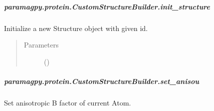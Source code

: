 \documentclass[a4paper,10pt,english]{sphinxmanual}
\begin{document}
\begin{fulllineitems}
\begin{fulllineitems}
\begin{fulllineitems}
\begin{quote}
\begin{description}
\end{description}\end{quote}

\end{fulllineitems}



\subparagraph{paramagpy.protein.CustomStructureBuilder.init\_structure}
\label{\detokenize{reference/generated/paramagpy.protein.CustomStructureBuilder.init_structure:paramagpy-protein-customstructurebuilder-init-structure}}\label{\detokenize{reference/generated/paramagpy.protein.CustomStructureBuilder.init_structure::doc}}

\begin{fulllineitems}
\label{\detokenize{reference/generated/paramagpy.protein.CustomStructureBuilder.init_structure:paramagpy.protein.CustomStructureBuilder.init_structure}}
Initialize a new Structure object with given id.
\begin{quote}\begin{description}
\item[{Parameters}] \leavevmode
{} (\sphinxstyleliteralemphasis{\sphinxupquote{-}}) \textendash{} 

\end{description}\end{quote}

\end{fulllineitems}



\subparagraph{paramagpy.protein.CustomStructureBuilder.set\_anisou}
\label{\detokenize{reference/generated/paramagpy.protein.CustomStructureBuilder.set_anisou:paramagpy-protein-customstructurebuilder-set-anisou}}\label{\detokenize{reference/generated/paramagpy.protein.CustomStructureBuilder.set_anisou::doc}}

\begin{fulllineitems}
\label{\detokenize{reference/generated/paramagpy.protein.CustomStructureBuilder.set_anisou:paramagpy.protein.CustomStructureBuilder.set_anisou}}
Set anisotropic B factor of current Atom.


\end{fulllineitems}
\end{fulllineitems}
\end{fulllineitems}
\end{document}
